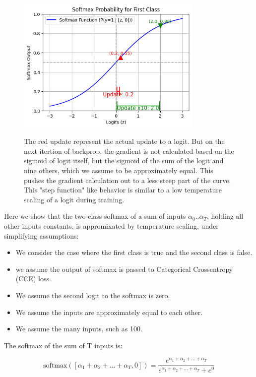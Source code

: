\documentclass[twoside,11pt]{article}
\begin{document}
\begin{figure}[htbp]
  \centering
  \includegraphics[width=0.8\textwidth]{temperature_grad.png}
  \label{fig:temperature_grad}
  \caption{
    The red update represent the actual update to a logit. But on the next
    itertion of backprop, the gradient is not calculated based on the sigmoid of 
    logit itself, but the sigmoid of the sum of the logit and nine others,
    which we assume to be approximately equal. This pushes the gradient
    calculation out to a less steep part of the curve. This "step function"
    like behavior is similar to a low temperature scaling of a logit
    during training. 
  }
\end{figure}

Here we show that the two-class softmax of a sum of inputs $\alpha_0..\alpha_T$, 
holding 
all other inputs constants, is appromixated by 
temperature scaling, under simplifying assumptions:

\begin{itemize}
  \item We consider the case where the first class is true and the second class is false. 
  \item we assume the output of softmax is passed to Categorical Crossentropy (CCE) loss. 
  \item We assume the second logit to the softmax is zero.
  \item We assume the inputs are approximately equal to each other. 
  \item We assume the many inputs, such as 100. 
\end{itemize}

The softmax of the sum of T inputs is:

\[
  \text{softmax}(
                 [\alpha_1 + \alpha_2 + \ldots + \alpha_T, 0])
  = 
  \frac{e^{\alpha_1 + \alpha_2 + \ldots + \alpha_T}}{e^{\alpha_1 + \alpha_2 + \ldots + \alpha_T} + e^0}
\]
\end{document}
